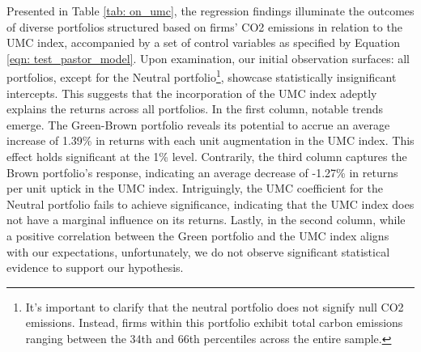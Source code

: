 \documentclass[12pt]{article}
\begin{document}
Presented in Table \ref{tab: on_umc}, the regression findings illuminate the outcomes of diverse portfolios structured based on firms' CO2 emissions in relation to the UMC index, accompanied by a set of control variables as specified by Equation \ref{eqn: test_pastor_model}. Upon examination, our initial observation surfaces: all portfolios, except for the Neutral portfolio\footnote{It's important to clarify that the neutral portfolio does not signify null CO2 emissions. Instead, firms within this portfolio exhibit total carbon emissions ranging between the 34th and 66th percentiles across the entire sample.}, showcase statistically insignificant intercepts. This suggests that the incorporation of the UMC index adeptly explains the returns across all portfolios. In the first column, notable trends emerge. The Green-Brown portfolio reveals its potential to accrue an average increase of 1.39\% in returns with each unit augmentation in the UMC index. This effect holds significant at the 1\% level. Contrarily, the third column captures the Brown portfolio's response, indicating an average decrease of -1.27\% in returns per unit uptick in the UMC index. Intriguingly, the UMC coefficient for the Neutral portfolio fails to achieve significance, indicating that the UMC index does not have a marginal influence on its returns. Lastly, in the second column, while a positive correlation between the Green portfolio and the UMC index aligns with our expectations, unfortunately, we do not observe significant statistical evidence to support our hypothesis.
\end{document}
